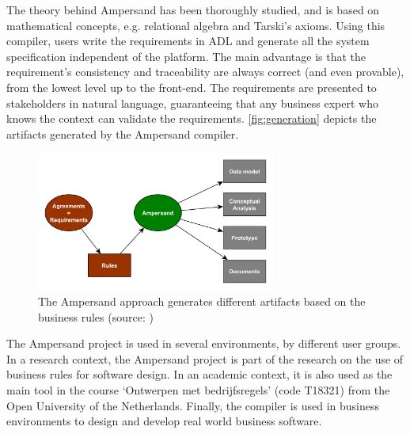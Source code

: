 The theory behind Ampersand has been thoroughly studied, and is based on mathe\-matical concepts, e.g. relational algebra and Tarski's axioms.
Using this compiler, users write the requirements in ADL and generate all the system specification independent of the platform.
The main advantage is that the requirement's consistency and traceability are always correct (and even provable), from the lowest level up to the front-end.
The requirements are presented to stakeholders in natural language, guaranteeing that any business expert who knows the context can validate the requirements.
\autoref{fig:generation} depicts the artifacts generated by the Ampersand compiler.
%
\begin{figure}[htb]
	\centering
	\includegraphics[width=0.7\textwidth]{Figures/Generation}
	\caption[Generated artifacts]{The Ampersand approach generates different artifacts based on the business rules (source: \cite{ampersand-approach})}
	\label{fig:generation}
\end{figure}
%

The Ampersand project is used in several environments, by different user groups.
In a research context, the Ampersand project is part of the research on the use of business rules for software design.
In an academic context, it is also used as the main tool in the course `Ontwerpen met bedrijfsregels' (code T18321) from the Open University of the Netherlands.
Finally, the compiler is used in business environments to design and develop real world business software.

